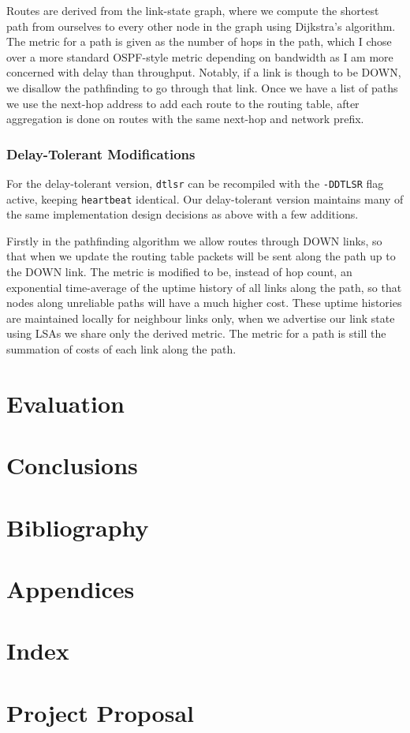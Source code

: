 \documentclass[10pt,twoside,a4paper]{article}
\begin{document}
Routes are derived from the link-state graph, where we compute the shortest path from ourselves to every other node in the graph using Dijkstra's algorithm. The metric for a path is given as the number of hops in the path, which I chose over a more standard OSPF-style metric depending on bandwidth as I am more concerned with delay than throughput. Notably, if a link is though to be DOWN, we disallow the pathfinding to go through that link. Once we have a list of paths we use the next-hop address to add each route to the routing table, after aggregation is done on routes with the same next-hop and network prefix.

\subsubsection{Delay-Tolerant Modifications}

For the delay-tolerant version, \texttt{dtlsr} can be recompiled with the \texttt{-DDTLSR} flag active, keeping \texttt{heartbeat} identical. Our delay-tolerant version maintains many of the same implementation design decisions as above with a few additions.

Firstly in the pathfinding algorithm we allow routes through DOWN links, so that when we update the routing table packets will be sent along the path up to the DOWN link. The metric is modified to be, instead of hop count, an exponential time-average of the uptime history of all links along the path, so that nodes along unreliable paths will have a much higher cost. These uptime histories are maintained locally for neighbour links only, when we advertise our link state using LSAs we share only the derived metric. The metric for a path is still the summation of costs of each link along the path.



\section{Evaluation}

\section{Conclusions}

\section{Bibliography}

\section{Appendices}

\section{Index}

\section{Project Proposal}
\end{document}
